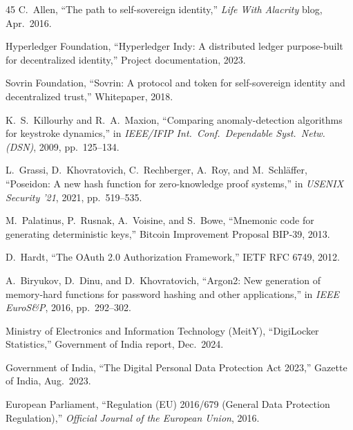 \documentclass[journal,twoside,10pt]{IEEEtran}
\begin{document}
\begin{thebibliography}{45}
C.~Allen, ``The path to self-sovereign identity,'' \emph{Life With
Alacrity} blog, Apr.\ 2016.

Hyperledger Foundation, ``Hyperledger Indy: A distributed ledger purpose-built
for decentralized identity,'' Project documentation, 2023.

Sovrin Foundation, ``Sovrin: A protocol and token for self-sovereign
identity and decentralized trust,'' Whitepaper, 2018.

K.~S.~Killourhy and R.~A.~Maxion, ``Comparing anomaly-detection algorithms
for keystroke dynamics,'' in \emph{IEEE/IFIP Int.\ Conf.\ Dependable Syst.\
Netw. (DSN)}, 2009, pp.~125--134.

L.~Grassi, D.~Khovratovich, C.~Rechberger, A.~Roy, and M.~Schl{\"a}ffer,
``Poseidon: A new hash function for zero-knowledge proof systems,'' in
\emph{USENIX Security '21}, 2021, pp.~519--535.

M.~Palatinus, P.~Rusnak, A.~Voisine, and S.~Bowe, ``Mnemonic code for
generating deterministic keys,'' Bitcoin Improvement Proposal BIP-39,
2013.

D.~Hardt, ``The OAuth 2.0 Authorization Framework,'' IETF RFC 6749, 2012.

A.~Biryukov, D.~Dinu, and D.~Khovratovich, ``Argon2: New generation of
memory-hard functions for password hashing and other applications,'' in
\emph{IEEE EuroS\&P}, 2016, pp.~292--302.

Ministry of Electronics and Information Technology (MeitY), ``DigiLocker
Statistics,'' Government of India report, Dec.\ 2024.

Government of India, ``The Digital Personal Data Protection Act 2023,''
Gazette of India, Aug.\ 2023.

European Parliament, ``Regulation (EU) 2016/679 (General Data Protection
Regulation),'' \emph{Official Journal of the European Union}, 2016.

\end{thebibliography}
\end{document}
